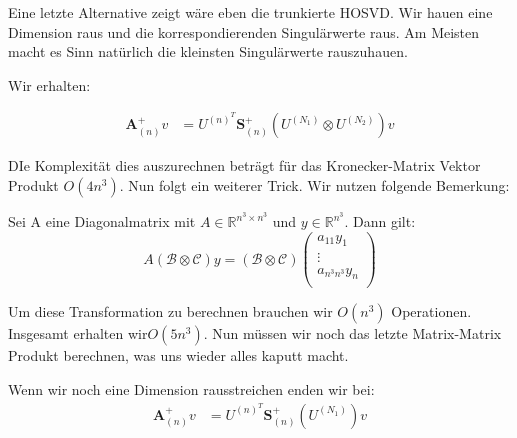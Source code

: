 Eine letzte Alternative zeigt wäre eben die trunkierte HOSVD.
Wir hauen eine Dimension raus und die korrespondierenden Singulärwerte raus. Am Meisten macht es Sinn natürlich die kleinsten Singulärwerte rauszuhauen. 

Wir erhalten:

\begin{equation}
\begin{aligned}
\mathscr{\textbf{A}}^{+}_{(n)}v&= U^{ (n) ^{T} }  \mathscr{\textbf{S}}^{+}_{(n)} ( U^{ (N_{1})  } \otimes U^{ (N_{2})} ) v
\end{aligned}
\end{equation}

DIe Komplexität dies auszurechnen beträgt für das Kronecker-Matrix Vektor Produkt $O(4n^3)$. Nun folgt ein weiterer Trick. Wir nutzen folgende Bemerkung:

\begin{Bemerkung}
Sei A eine Diagonalmatrix mit $A \in \mathbb{R}^{n^3 \times n^3}$ und $y \in \mathbb{R}^{n^3}$. Dann gilt:
\begin{equation*}
A(\mathcal{B} \otimes \mathcal{C})y = (\mathcal{B} \otimes \mathcal{C}) 
\begin{pmatrix}
a_{11} y_1 \\ \vdots \\ a_{n^3 n^3} y_n \\
\end{pmatrix}
\end{equation*}
\end{Bemerkung}

Um diese Transformation zu berechnen brauchen wir $O(n^3)$ Operationen. Insgesamt erhalten wir$ O(5n^3)$. Nun müssen wir noch das letzte Matrix-Matrix Produkt berechnen, was uns wieder alles kaputt macht.

Wenn wir noch eine Dimension rausstreichen enden wir bei:
\begin{equation}
\begin{aligned}
\mathcal{\textbf{A}}^{+}_{(n)}v&= U^{ (n) ^{T} }  \mathcal{\textbf{S}}^{+}_{(n)} ( U^{ (N_{1})  } ) v
\end{aligned}
\end{equation}